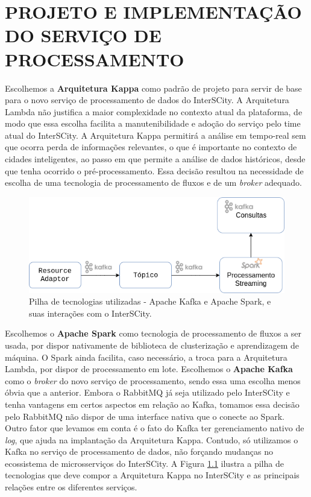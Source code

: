 \chapter[PROJETO E IMPLEMENTAÇÃO DO SERVIÇO DE PROCESSAMENTO]{PROJETO E IMPLEMENTAÇÃO DO SERVIÇO DE PROCESSAMENTO}

\label{chapter:architecture}

Escolhemos a \textbf{Arquitetura Kappa} como padrão de projeto para servir
de base para o novo serviço de processamento de dados do InterSCity.
A Arquitetura Lambda não justifica a maior complexidade no contexto atual da
plataforma, de modo que essa escolha facilita a manutenibilidade e adoção do
serviço pelo time atual do InterSCity. A Arquitetura Kappa permitirá a análise
em tempo-real sem que ocorra perda de informações relevantes, o que é
importante no contexto de cidades inteligentes, ao passo em que permite a
análise de dados históricos, desde que tenha ocorrido o pré-processamento.
Essa decisão resultou na necessidade de escolha de uma tecnologia de
processamento de fluxos e de um \textit{broker} adequado.

\begin{figure}[hbt]
  \centering
    \includegraphics[scale=0.5]{figuras/kappa_tools2.png}
  \caption{Pilha de tecnologias utilizadas - Apache Kafka e Apache Spark, e suas
    interações com o InterSCity.}
  \label{fig:stack}
\end{figure}

Escolhemos o \textbf{Apache Spark} como tecnologia de processamento de fluxos
a ser usada, por dispor nativamente de biblioteca de clusterização
e aprendizagem de máquina. O Spark ainda facilita, caso necessário, a
troca para a Arquitetura Lambda, por dispor de processamento em lote.
Escolhemos o \textbf{Apache Kafka} como o \textit{broker} do novo serviço de
processamento, sendo essa uma escolha menos óbvia que a anterior. Embora o
RabbitMQ já seja utilizado pelo InterSCity e tenha vantagens em certos aspectos
em relação ao Kafka, tomamos essa decisão pelo RabbitMQ não dispor de uma
interface nativa que o conecte ao Spark. Outro fator que levamos em conta é o
fato do Kafka ter gerenciamento nativo de \textit{log}, que ajuda na
implantação da Arquitetura Kappa. Contudo, só utilizamos o Kafka no serviço
de processamento de dados, não forçando mudanças no ecossistema de
microsserviços do InterSCity. A Figura \ref{fig:stack} ilustra a pilha de
tecnologias que deve compor a Arquitetura Kappa no InterSCity e as principais
relações entre os diferentes serviços.

